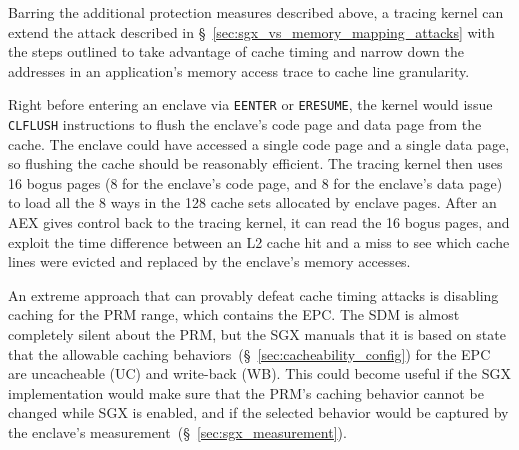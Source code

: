 Barring the additional protection measures described above, a tracing kernel
can extend the attack described in \S~\ref{sec:sgx_vs_memory_mapping_attacks}
with the steps outlined to take advantage of cache timing and narrow down the
addresses in an application's memory access trace to cache line granularity.

Right before entering an enclave via \texttt{EENTER} or \texttt{ERESUME}, the
kernel would issue \texttt{CLFLUSH} instructions to flush the enclave's code
page and data page from the cache. The enclave could have accessed a single
code page and a single data page, so flushing the cache should be reasonably
efficient. The tracing kernel then uses 16 bogus pages (8 for the enclave's
code page, and 8 for the enclave's data page) to load all the 8 ways in the 128
cache sets allocated by enclave pages. After an AEX gives control back to the
tracing kernel, it can read the 16 bogus pages, and exploit the time difference
between an L2 cache hit and a miss to see which cache lines were evicted and
replaced by the enclave's memory accesses.


An extreme approach that can provably defeat cache timing attacks is disabling
caching for the PRM range, which contains the EPC. The SDM is almost completely
silent about the PRM, but the SGX manuals that it is based on state that
the allowable caching behaviors~(\S~\ref{sec:cacheability_config}) for the EPC
are uncacheable (UC) and write-back (WB). This could become useful if the SGX
implementation would make sure that the PRM's caching behavior cannot be
changed while SGX is enabled, and if the selected behavior would be captured by
the enclave's measurement~(\S~\ref{sec:sgx_measurement}).
